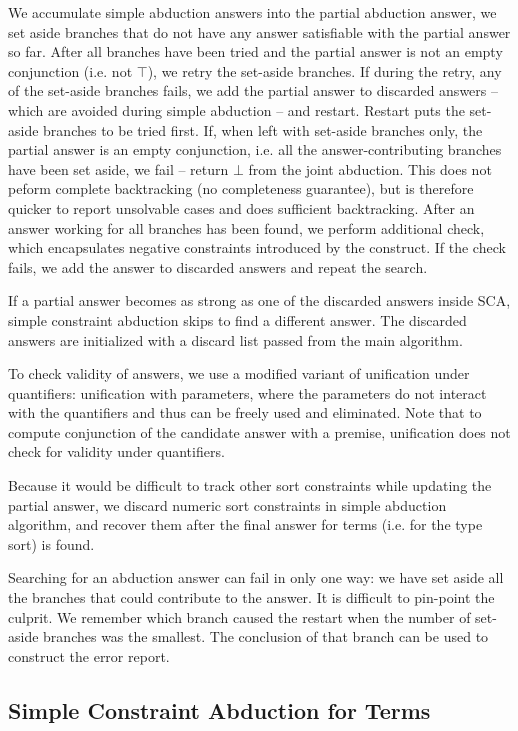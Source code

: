 \documentclass{article}
\newcommand{\tmverbatim}[1]{{\ttfamily{#1}}}
\begin{document}
We accumulate simple abduction answers into the partial abduction answer, we
set aside branches that do not have any answer satisfiable with the partial
answer so far. After all branches have been tried and the partial answer is
not an empty conjunction (i.e. not $\top$), we retry the set-aside branches.
If during the retry, any of the set-aside branches fails, we add the partial
answer to discarded answers -- which are avoided during simple abduction --
and restart. Restart puts the set-aside branches to be tried first. If, when
left with set-aside branches only, the partial answer is an empty conjunction,
i.e. all the answer-contributing branches have been set aside, we fail --
return $\bot$ from the joint abduction. This does not peform complete
backtracking (no completeness guarantee), but is therefore quicker to report
unsolvable cases and does sufficient backtracking. After an answer working for
all branches has been found, we perform additional check, which encapsulates
negative constraints introduced by the \tmverbatim{assert false} construct. If
the check fails, we add the answer to discarded answers and repeat the search.

If a partial answer becomes as strong as one of the discarded answers inside
SCA, simple constraint abduction skips to find a different answer. The
discarded answers are initialized with a discard list passed from the main
algorithm.

To check validity of answers, we use a modified variant of unification under
quantifiers: unification with parameters, where the parameters do not interact
with the quantifiers and thus can be freely used and eliminated. Note that to
compute conjunction of the candidate answer with a premise, unification does
not check for validity under quantifiers.

Because it would be difficult to track other sort constraints while updating
the partial answer, we discard numeric sort constraints in simple abduction
algorithm, and recover them after the final answer for terms (i.e. for the
type sort) is found.

Searching for an abduction answer can fail in only one way: we have set aside
all the branches that could contribute to the answer. It is difficult to
pin-point the culprit. We remember which branch caused the restart when the
number of set-aside branches was the smallest. The conclusion of that branch
can be used to construct the error report.

\subsection{Simple Constraint Abduction for Terms}\label{SCATermsAlg}
\end{document}
